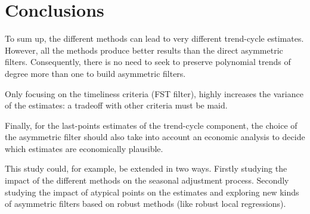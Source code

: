 \documentclass[12pt,,a4paper]{article}
\begin{document}
\hypertarget{conclusions}{%
\section{Conclusions}\label{conclusions}}

To sum up, the different methods can lead to very different trend-cycle estimates.
However, all the methods produce better results than the direct asymmetric filters.
Consequently, there is no need to seek to preserve polynomial trends of degree more than one to build asymmetric filters.

Only focusing on the timeliness criteria (FST filter), highly increases the variance of the estimates: a tradeoff with other criteria must be maid.

Finally, for the last-points estimates of the trend-cycle component, the choice of the asymmetric filter should also take into account an economic analysis to decide which estimates are economically plausible.

This study could, for example, be extended in two ways.
Firstly studying the impact of the different methods on the seasonal adjustment process.
Secondly studying the impact of atypical points on the estimates and exploring new kinds of asymmetric filters based on robust methods (like robust local regressions).

\renewcommand\refname{References}

\end{document}
